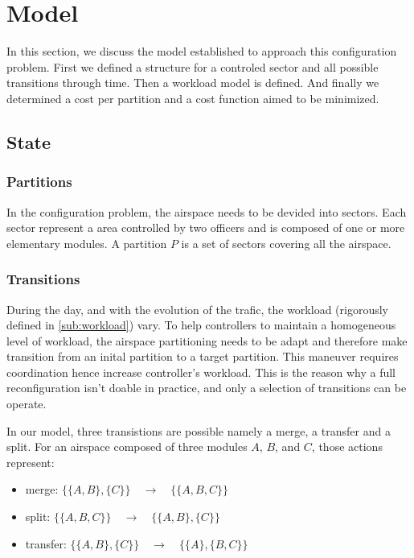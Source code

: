 \documentclass[oneside,twocolumn]{article}
\begin{document}
\section{Model}

In this section, we discuss the model established to approach this configuration
problem. First we defined a structure for a controled sector and all possible
transitions through time. Then a workload model is defined. And finally we
determined a cost per partition and a cost function aimed to be minimized.

\subsection{State}

\subsubsection{Partitions}

In the configuration problem, the airspace needs to be devided into sectors. Each
sector represent a area controlled by two officers and is composed of
one or more elementary modules. A partition $P$ is a set of
sectors covering all the airspace.

\subsubsection{Transitions}

During the day, and with the evolution of the trafic, the workload (rigorously
defined in \ref{sub:workload}) vary. To help controllers to maintain a
homogeneous level of workload, the airspace partitioning needs to be adapt
and therefore make transition from an inital partition to a target partition.
This maneuver requires coordination hence increase controller's workload.
This is the reason why a full reconfiguration isn't doable in practice, and
only a selection of transitions can be operate.

In our model, three transistions are possible namely a merge, a transfer
and a split. For an airspace composed of three modules $A$, $B$, and $C$,
those actions represent:
\begin{itemize}
  \item merge: $\{\{A, B\}, \{C\}\} \quad \rightarrow \quad \{\{A, B, C\}\}$ 
  \item split: $\{\{A, B, C\}\} \quad \rightarrow \quad \{\{A, B\}, \{C\}\}$ 
  \item transfer: $\{\{A, B\}, \{C\}\} \quad \rightarrow \quad \{\{A\}, \{B, C\}\}$ 
\end{itemize}
\end{document}
